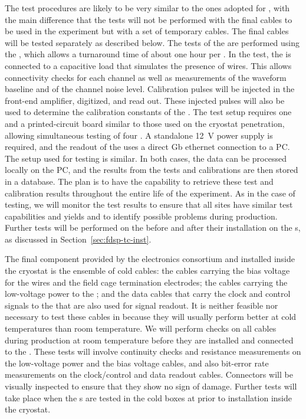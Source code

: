 The test procedures are likely to be
very similar to the ones adopted for , with the main
difference that the tests will not be performed with
the final cables to be used in the experiment but 
with a set of temporary cables. The final cables will be tested
separately as described below. The tests of the 
are performed using the , which allows a turnaround
time of about one hour per . In the
test, the  is connected to a capacitive load that
simulates the presence of  wires. This allows
connectivity checks for each channel as well as measurements of
the waveform baseline and of the channel noise level. Calibration 
pulses will be injected in the front-end amplifier, digitized,
and read out. These injected pulses will also be used
to determine the calibration constants of the . 
The test setup requires one  and
a printed-circuit board similar to those used on the cryostat
penetration, allowing simultaneous testing of four .
A standalone \SI{12}{V} power supply is required, and the readout
of the  uses a direct Gb ethernet connection to
a PC. The setup used for  testing is similar.
In both cases, the data can be processed locally on the PC,
and the results from the tests and calibrations are then stored 
in a database. The plan is to have the capability to retrieve  
these test and calibration results throughout the entire life
of the experiment. As in the case of  testing,
we will monitor the test results to ensure that all
sites have similar test capabilities and yields and to
identify possible problems during production.
Further tests will be performed on the 
before and after their installation on the s, as
discussed in Section~\ref{sec:fdsp-tc-inst}.

The final component provided by the  electronics consortium
and installed inside the cryostat is the ensemble of cold
cables: the cables carrying the bias voltage for the 
wires and the field cage termination electrodes;
the cables carrying the low-voltage power to the ;
and the data cables that carry the clock and control signals
to the  that are also used for signal readout. It is neither
feasible nor necessary to test these cables in \lntwo
because they will usually perform better at cold temperatures than 
room temperature. We will perform checks on all cables 
during production at room temperature before they are installed and 
connected to the . These tests will involve continuity checks
and resistance measurements on the low-voltage power and the bias voltage
cables, and also bit-error rate measurements on the clock/control and 
data readout cables. Connectors will be visually inspected to
ensure that they show no sign of damage.  Further tests will take place
when the s are tested in the cold boxes at 
prior to installation inside the cryostat.

